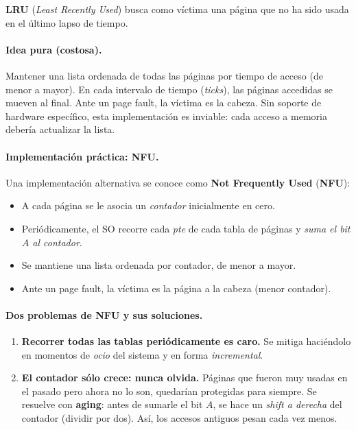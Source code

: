 \documentclass[11pt,a4paper]{article}
\begin{document}
\textbf{LRU} (\emph{Least Recently Used}) busca como víctima una página
que no ha sido usada en el último lapso de tiempo.

\paragraph{Idea pura (costosa).}
Mantener una lista ordenada de todas las páginas por tiempo de acceso
(de menor a mayor). En cada intervalo de tiempo (\emph{ticks}), las
páginas accedidas se mueven al final. Ante un page fault, la víctima es
la cabeza. Sin soporte de hardware específico, esta implementación es
inviable: cada acceso a memoria debería actualizar la lista.

\paragraph{Implementación práctica: NFU.}
Una implementación alternativa se conoce como \textbf{Not Frequently
Used} (\textbf{NFU}):

\begin{itemize}[leftmargin=*]
    \item A cada página se le asocia un \emph{contador} inicialmente
        en cero.
    \item Periódicamente, el SO recorre cada \emph{pte} de cada tabla
        de páginas y \emph{suma el bit $A$ al contador}.
    \item Se mantiene una lista ordenada por contador, de menor a
        mayor.
    \item Ante un page fault, la víctima es la página a la cabeza
        (menor contador).
\end{itemize}

\paragraph{Dos problemas de NFU y sus soluciones.}

\begin{enumerate}[leftmargin=*]
    \item \textbf{Recorrer todas las tablas periódicamente es caro.}
        Se mitiga haciéndolo en momentos de \emph{ocio} del sistema y
        en forma \emph{incremental}.
    \item \textbf{El contador sólo crece: nunca olvida.} Páginas que
        fueron muy usadas en el pasado pero ahora no lo son, quedarían
        protegidas para siempre. Se resuelve con \textbf{aging}: antes
        de sumarle el bit $A$, se hace un \emph{shift a derecha} del
        contador (dividir por dos). Así, los accesos antiguos pesan
        cada vez menos.
\end{enumerate}
\end{document}
